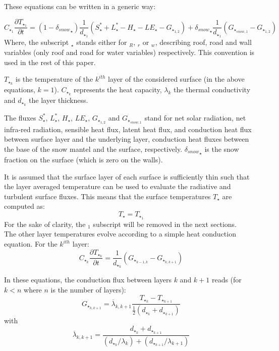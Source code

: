 These equations can be written in a generic way:

\begin{equation}
C_{\star_1}\frac{\partial T_{\star_1} }{\partial t} = (1-{\delta_{snow}}_\star)\frac{1}{d_{\star_1}}
\left( S_{\star}^* + L_{\star}^* - H_\star -LE_\star - G_{\star_{1,2}} \right)
+ {\delta_{snow}}_\star\frac{1}{d_{\star_1}}
\left( G_{\star_{snow,1}} - G_{\star_{1,2}} \right)
\end{equation}
Where, the subscript $_\star$
stands either for $_R$, $_r$ or $_w$, describing
roof, road and wall variables (only roof and road
for water variables) respectively. This convention is used
in the rest of this paper.

$T_{\star_k}$ is the temperature of the $k^{ith}$ layer of the considered
surface (in the above equations, $k=1$). $C_{\star_k}$ represents
the heat capacity,
$\lambda_k$ the thermal conductivity and $d_{\star_k}$ the layer thickness.

The fluxes $S_{\star}^*$, $L_{\star}^*$,
$H_\star$, $LE_\star$, $G_{\star_{1,2}}$ and $G_{\star_{snow,1}}$
stand for net solar radiation, net infra-red radiation,
sensible heat flux, latent heat
flux, and conduction heat flux between surface layer and the underlying layer,
conduction heat fluxes between the base of the snow mantel and the surface,
respectively. 
${\delta_{snow}}_\star$ is the snow fraction on the surface (which is
zero on the walls).

It is assumed that the surface layer of each surface
is sufficiently thin such that the layer averaged temperature can be used to
evaluate the radiative and turbulent surface fluxes.
This means that the surface temperatures $T_{\star}$ are computed as:
\begin{displaymath}
T_{\star} = T_{\star_1}
\end{displaymath}
For the sake of clarity, the $_1$ subscript will be removed in the next sections.
\\

The other layer temperatures evolve according to a simple heat conduction
equation. For the $k^{ith}$ layer:
\begin{equation}
C_{\star_k}\frac{\partial T_{\star_k} }{\partial t} = 
\frac{1}{d_{\star_k}}
\left( G_{\star_{k-1,k}} - G_{\star_{k,k+1}} \right)
\end{equation}

In these equations, the conduction flux between layers $k$ and
$k+1$ reads (for $k<n$ where $n$ is the number of layers):
\begin{equation}
G_{\star_{k,k+1}} = \overline{\lambda}_{k,k+1}
\frac{T_{\star_{k}}-T_{\star_{k+1}}}{\frac{1}{2}(d_{\star_k}+d_{\star_{k+1}})}
\end{equation}
with
\begin{equation}
\overline{\lambda}_{k,k+1} =
\frac{d_{\star_{k}}+d_{\star_{k+1}}}{(d_{\star_k}/\lambda_k)
+(d_{\star_{k+1}}/\lambda_{k+1})}
\end{equation}

